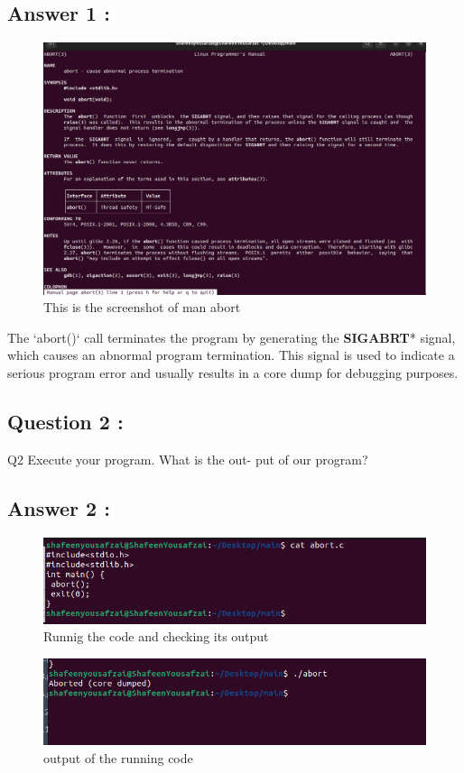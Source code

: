 \documentclass[12pt]{article}
\begin{document}
\subsection{Answer 1 :}
\begin{figure}[H]
    \centering
    \includegraphics[width=\textwidth]{asdasd.png}
    \caption{This is the screenshot of man abort}
    \label{fig:enter-label}
\end{figure}
The `abort()` call terminates the program by generating the \textbf{SIGABRT}* signal, which causes an abnormal program termination. This signal is used to indicate a serious program error and usually results in a core dump for debugging purposes.
\subsection{Question 2 :}
Q2 Execute your program. What is the out-
put of our program?
\subsection{Answer 2 :}
\begin{figure}[H]
    \centering
    \includegraphics[width=\textwidth]{111.png}
    \caption{Runnig the code and checking its output}
    \label{fig:enter-label}
\end{figure}

\begin{figure}[H]
    \centering
    \includegraphics[width=\textwidth]{21312.png}
    \caption{output of the running code}
    \label{fig:enter-label}
\end{figure}
\end{document}
